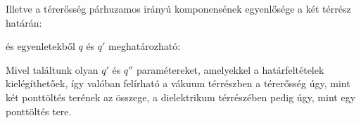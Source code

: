  Illetve a térerősség párhuzamos irányú komponensének egyenlősége a két térrész határán:
 
  és  egyenletekből $q$ és $q'$ meghatározható:
 
 Mivel találtunk olyan $q'$ és $q''$ paramétereket, amelyekkel a határfeltételek kielégíthetőek, így valóban felírható a vákuum térrészben a térerősség úgy, mint két ponttöltés terének az összege, a dielektrikum térrészében pedig úgy, mint egy ponttöltés tere.
 
\fi